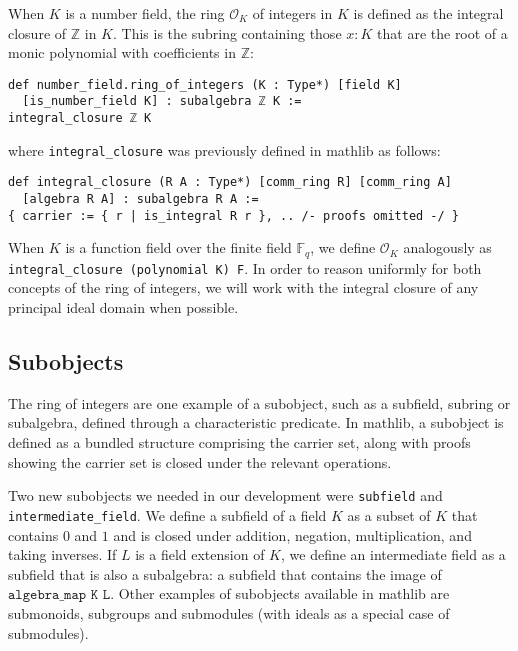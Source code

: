 \documentclass[a4paper,USenglish,cleveref, autoref, thm-restate]{lipics-v2021}
\newcommand{\lean}[1]{\texttt{#1}\xspace} %
\newcommand*{\OK}[1][K]{\mathcal{O}_{#1}}
\newcommand*{\Fq}[1][q]{\mathbb{F}_{#1}}
\newcommand{\mathlib}{\textsf{mathlib}\xspace}
\newcommand{\Q}{\mathbb{Q}}
\newcommand{\Z}{\mathbb{Z}}
\begin{document}
When $K$ is a number field, the ring $\OK$ of integers in $K$ is defined as the integral closure of $\Z$ in $K$.
This is the subring containing those $x : K$ that are the root of a monic polynomial with coefficients in $\Z$:
\begin{lstlisting}
def number_field.ring_of_integers (K : Type*) [field K]
  [is_number_field K] : subalgebra ℤ K :=
integral_closure ℤ K
\end{lstlisting}
where \lean{integral\_closure} was previously defined in \mathlib as follows:
\begin{lstlisting}
def integral_closure (R A : Type*) [comm_ring R] [comm_ring A]
  [algebra R A] : subalgebra R A :=
{ carrier := { r | is_integral R r }, .. /- proofs omitted -/ }
\end{lstlisting}

When $K$ is a function field over the finite field $\Fq$, we define $\OK$ analogously as \lean{integral\_closure (polynomial K) F}.
In order to reason uniformly for both concepts of the ring of integers,
we will work with the integral closure of any principal ideal domain when possible.

\subsection{Subobjects} \label{sec:subobjects}

The ring of integers are one example of a subobject, such as a subfield, subring or subalgebra, defined through a characteristic predicate.
In \mathlib, a subobject is defined as a bundled structure comprising the carrier set,
along with proofs showing the carrier set is closed under the relevant operations.

Two new subobjects we needed in our development were \lean{subfield} and \lean{intermediate\-\_field}.
We define a subfield of a field $K$ as a subset of $K$ that contains $0$ and $1$ and is closed under addition, negation, multiplication, and taking inverses.
If $L$ is a field extension of $K$, we define an intermediate field as a subfield that is also a subalgebra: a subfield that contains the image of $\lean{algebra\_map K L}$.
Other examples of subobjects available in \mathlib are submonoids, subgroups and submodules (with ideals as a special case of submodules).
\end{document}
